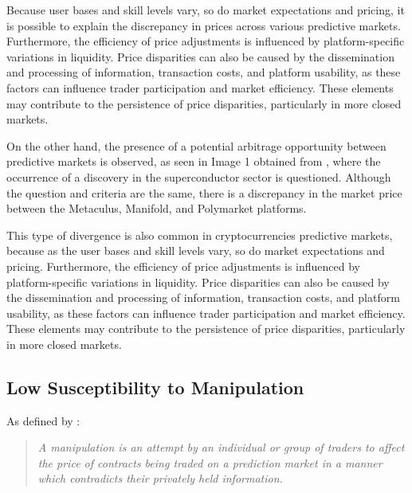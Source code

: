 Because user bases and skill levels vary, so do market expectations and pricing, it is possible to explain the discrepancy in prices across various predictive markets. Furthermore, the efficiency of price adjustments is influenced by platform-specific variations in liquidity. Price disparities can also be caused by the dissemination and processing of information, transaction costs, and platform usability, as these factors can influence trader participation and market efficiency. These elements may contribute to the persistence of price disparities, particularly in more closed markets.

On the other hand, the presence of a potential arbitrage opportunity between predictive markets is observed, as seen in Image 1 obtained from \citeauthor{lPolack}, where the occurrence of a discovery in the superconductor sector is questioned. Although the question and criteria are the same, there is a discrepancy in the market price between the Metaculus, Manifold, and Polymarket platforms.

    \begin{center}
    \end{center}

This type of divergence is also common in cryptocurrencies predictive markets, because as the user bases and skill levels vary, so do market expectations and pricing. Furthermore, the efficiency of price adjustments is influenced by platform-specific variations in liquidity. Price disparities can also be caused by the dissemination and processing of information, transaction costs, and platform usability, as these factors can influence trader participation and market efficiency. These elements may contribute to the persistence of price disparities, particularly in more closed markets.

\subsection{Low Susceptibility to Manipulation}
\label{subsec:low_susceptibility_to_manipulation}

As defined by \cite{buckley2017effect}:
\begin{quote}
    \textit{A manipulation is an attempt by an individual or group of traders to affect the price of contracts being traded on a prediction market in a manner which contradicts their privately held information.}
\end{quote}
    
